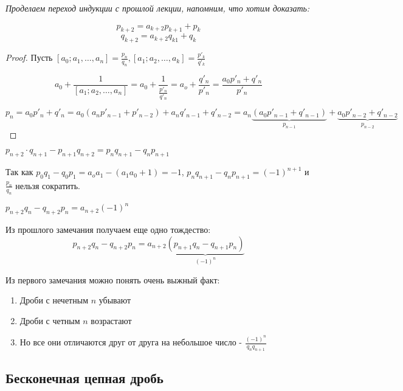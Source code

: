 
\textit{Проделаем переход индукции с прошлой лекции, напомним, что хотим доказать:}

\begin{theorem}
  $$p_{k + 2} = a_{k + 2} p_{k + 1} + p_k$$
  $$q_{k + 2} = a_{k + 2} q_{k 1} + q_k$$
\end{theorem}

\begin{proof}
  Пусть $[a_0; a_1,\dots, a_n] = \frac{p_n}{q_n}, [a_1; a_2, \dots, a_k] = \frac{p'_k}{q'_k}$

  $$a_0 + \frac{1}{[a_1; a_2, \dots, a_n]} = a_0 + \frac{1}{\frac{p'_n}{q'_n}} = a_o + \frac{q'_n}{p'_n} = \frac{a_0 p'_n + q'_n}{p'_n}$$

  $$p_n = a_0 p'_n + q'_n = a_0 (a_n p'_{n - 1} + p'_{n - 2}) + a_n q'_{n - 1 } + q'_{n - 2} = a_n \underbrace{(a_0 p'_{n - 1} + q'_{n  - 1}) }_{p_{n-1}}+ \underbrace{a_0 p'_{n - 2} + q'_{n - 2}}_{p_{n-2}}$$
\end{proof}

\begin{note}
$p_{n + 2} \cdot q_{n + 1} - p_{n + 1} q_{n + 2} = p_n q_{n + 1} - q_{n}p_{n + 1}$

Так как $p_0 q_1 - q_0 p_1 = a_o a_1 - (a_1 a_0 + 1) = -1$, $p_n q_{n + 1} - q_n p_{n + 1} = (-1)^{n + 1}$ и $\frac{p_n}{q_n}$ нельзя сократить.
\end{note}

\begin{note} $p_{n + 2}q_n - q_{n + 2}p_n = a_{n + 2} (-1)^n$

Из прошлого замечания получаем еще одно тождество:
$$p_{n + 2}q_n - q_{n + 2}p_n = a_{n + 2}\underbrace{(p_{n + 1}q_n - q_{n + 1}p_n)}_{(-1)^n}$$
\end{note}

\begin{proposition}
  Из первого замечания можно понять очень выжный факт:
  \begin{enumerate}
    \item Дроби с нечетным $n$ убывают
    \item Дроби с четным $n$ возрастают
    \item Но все они отличаются друг от друга на небольшое число - $\frac{(-1)^n}{q_n q_{n + 1}}$
  \end{enumerate}
\end{proposition}

\subsection{Бесконечная цепная дробь}

